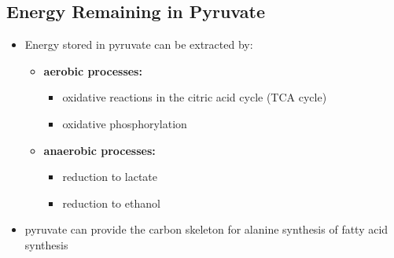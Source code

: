 \documentclass[10pt]{article}
\begin{document}
\subsection*{Energy Remaining in Pyruvate}
\begin{itemize}
	\item Energy stored in pyruvate can be extracted by:
	\begin{itemize}
        \item \textbf{aerobic processes:}
        \begin{itemize}
            \item oxidative reactions in the citric acid cycle (TCA cycle)
            \item oxidative phosphorylation
        \end{itemize}
        \item \textbf{anaerobic processes:}
        \begin{itemize}
            \item reduction to lactate
            \item reduction to ethanol
        \end{itemize}
    \end{itemize}
    \item pyruvate can provide the carbon skeleton for alanine synthesis of fatty acid synthesis
\end{itemize}
\end{document}
